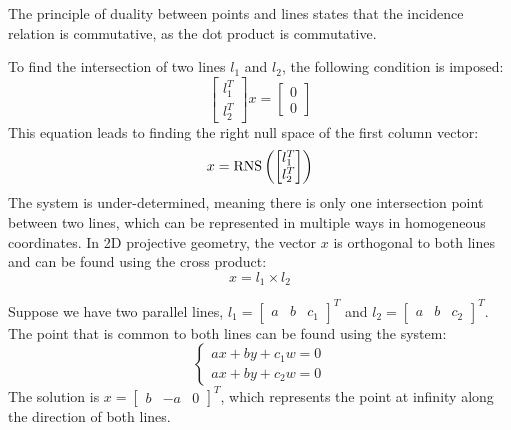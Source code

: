 The principle of duality between points and lines states that the incidence relation is commutative, as the dot product is commutative.

























To find the intersection of two lines $l_1$ and $l_2$, the following condition is imposed:
\[\begin{bmatrix} l_1^T \\ l_2^T \end{bmatrix} x = \begin{bmatrix} 0 \\ 0 \end{bmatrix}\]
This equation leads to finding the right null space of the first column vector:
\[x=\textnormal{RNS}\left(\begin{bmatrix}l_1^T \\ l_2^T \end{bmatrix} \right)\]
The system is under-determined, meaning there is only one intersection point between two lines, which can be represented in multiple ways in homogeneous coordinates.
In 2D projective geometry, the vector $x$ is orthogonal to both lines and can be found using the cross product:
\[x=l_1 \times l_2\]
\begin{example}
    Suppose we have two parallel lines, $l_1={\begin{bmatrix} a & b & c_1 \end{bmatrix}}^T$ and $l_2={\begin{bmatrix} a & b & c_2 \end{bmatrix}}^T$. 
    The point that is common to both lines can be found using the system:
    \[
        \begin{cases}
            ax+by+c_1w=0 \\
            ax+by+c_2w=0
        \end{cases}
    \]
    The solution is ${x=\begin{bmatrix} b & -a & 0 \end{bmatrix}}^T$, which represents the point at infinity along the direction of both lines.
\end{example}

